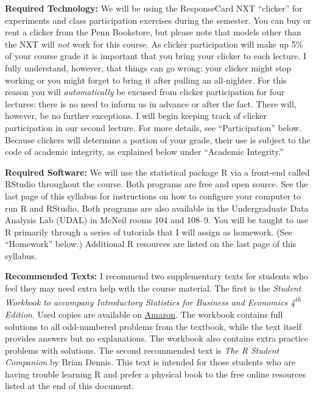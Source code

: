 \documentclass[11pt, letterpaper]{article}
\begin{document}
\noindent \textbf{Required Technology: } We will be using the ResponseCard NXT ``clicker'' for experiments and class participation exercises during the semester. You can buy or rent a clicker from the Penn Bookstore, but please note that models other than the NXT will \emph{not} work for this course. As clicker participation will make up 5\% of your course grade it is important that you bring your clicker to each lecture. I fully understand, however, that things can go wrong: your clicker might stop working or you might forget to bring it after pulling an all-nighter. For this reason you will \emph{automatically} be excused from clicker participation for four lectures: there is no need to inform us in advance or after the fact. There will, however, be no further exceptions. I will begin keeping track of clicker participation in our second lecture. For more details, see ``Participation'' below. Because clickers will determine a portion of your grade, their use is subject to the code of academic integrity, as explained below under ``Academic Integrity.'' 

\newpage

\noindent \textbf{Required Software:} We will use the statistical package R via a front-end called RStudio throughout the course. Both programs are free and open source. See the last page of this syllabus for instructions on how to configure your computer to run R and RStudio. Both programs are also available in the Undergraduate Data Analysis Lab (UDAL) in McNeil rooms 104 and 108--9. You will be taught to use R primarily through a series of tutorials that I will assign as homework. (See ``Homework'' below.)  Additional R resources are listed on the last page of this syllabus.

\bigskip

\noindent \textbf{Recommended Texts:} I recommend two supplementary texts for students who feel they may need extra help with the course material. The first is the \emph{Student Workbook to accompany Introductory Statistics for Business and Economics 4\textsuperscript{th} Edition}. Used copies are available on \href{http://www.amazon.com/gp/offer-listing/0471508993/sr=/qid=/ref=olp_page_2?ie=UTF8&colid=&coliid=&condition=all&me=&qid=&shipPromoFilter=0&sort=sip&sr=&startIndex=10}{Amazon}. The workbook contains full solutions to all odd-numbered problems from the textbook, while the text itself provides answers but no explanations. The workbook also contains extra practice problems with solutions. The second recommended text is \emph{The R Student Companion} by Brian Dennis. This text is intended for those students who are having trouble learning R and prefer a physical book to the free online resources listed at the end of this document. 
\end{document}
